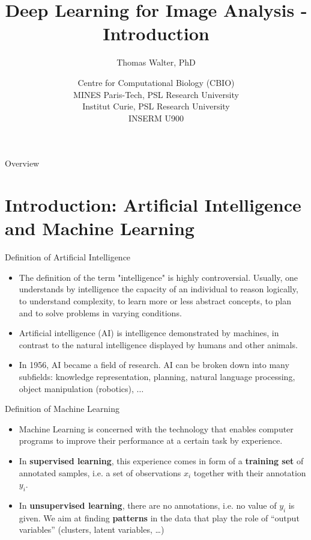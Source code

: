 \documentclass[xcolor=pdftex,dvipsnames,table]{beamer}
\title{Deep Learning for Image Analysis - Introduction}
\author{Thomas Walter, PhD}
\date{Centre for Computational Biology (CBIO) \\
	  MINES Paris-Tech, PSL Research University \\
	  Institut Curie, PSL Research University \\
	  INSERM U900}
\begin{document}
\begin{frame}
\titlepage
\end{frame}

\begin{frame}{Overview}
\tableofcontents
\end{frame}

\section{Introduction: Artificial Intelligence and Machine Learning}
\frame{\tableofcontents[currentsection]}

\begin{frame}{Definition of Artificial Intelligence}
\begin{itemize}
	\item The definition of the term "intelligence" is highly controversial. Usually, one understands by intelligence the capacity of an individual to reason logically, to understand complexity, to learn more or less abstract concepts, to plan and to solve problems in varying conditions. 	
	\item Artificial intelligence (AI) is intelligence demonstrated by machines, in contrast to the natural intelligence displayed by humans and other animals. 
	\item In 1956, AI became a field of research. AI can be broken down into many subfields: knowledge representation, planning, natural language processing, object manipulation (robotics), $\ldots$
\end{itemize}
\end{frame}

\begin{frame}{Definition of Machine Learning}
\begin{itemize}
	\item Machine Learning is concerned with the technology that enables computer programs to improve their performance at a certain task by experience. 
	\item In \textbf{supervised learning}, this experience comes in form of a \textbf{training set} of annotated samples, i.e. a set of observations $x_i$ together with their annotation $y_i$.
	\item In \textbf{unsupervised learning}, there are no annotations, i.e. no value of $y_i$ is given. We aim at finding \textbf{patterns} in the data that play the role of “output variables” (clusters, latent variables, …)
\end{itemize}
\end{frame}
\end{document}
